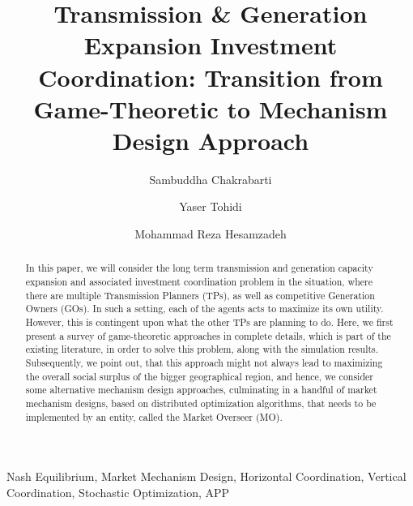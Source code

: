 \documentclass[preprint,12pt,3p]{elsarticle}
\begin{document}
\begin{frontmatter}

\title{Transmission  \& Generation Expansion Investment Coordination: Transition from Game-Theoretic to Mechanism Design Approach
}


\author[label1,label2]{Sambuddha Chakrabarti}
\address[label1]{Address One}
\address[label2]{Address Two}



\author[label5]{Yaser Tohidi}
\address[label5]{Technische Universiteit Eindhoven (TU Eindhoven)}

\author[label1,label5]{Mohammad Reza Hesamzadeh}

\begin{abstract}
In this paper, we will consider the long term transmission  and generation capacity expansion and associated investment coordination problem in the situation, where there are multiple Transmission Planners (TPs), as well as competitive Generation Owners (GOs). In such a setting, each of the agents acts to maximize its own utility. However, this is contingent upon what the other TPs are planning to do. Here, we first present a survey of game-theoretic approaches in complete details, which is part of the existing literature, in order to solve this problem, along with the simulation results. Subsequently, we point out, that this approach might not always lead to maximizing the overall social surplus of the bigger geographical region, and hence, we consider some alternative mechanism design approaches, culminating in a handful of market mechanism designs, based on distributed optimization algorithms, that needs to be implemented by an entity, called the Market Overseer (MO).
\end{abstract}

\begin{keyword}
Nash Equilibrium, Market Mechanism Design, Horizontal Coordination, Vertical Coordination, Stochastic Optimization, APP
\end{keyword}

\end{frontmatter}
\end{document}
